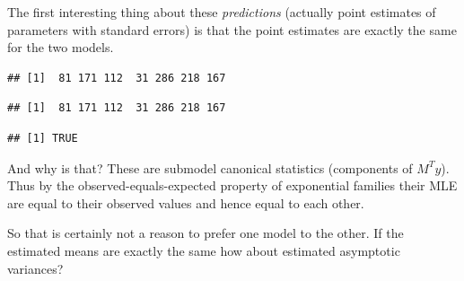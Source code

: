 \documentclass[
  ignorenonframetext,
]{beamer}
\newenvironment{Shaded}{\begin{snugshade}}{\end{snugshade}}
\newcommand{\FunctionTok}[1]{\textcolor[rgb]{0.13,0.29,0.53}{\textbf{#1}}}
\newcommand{\NormalTok}[1]{#1}
\newcommand{\SpecialCharTok}[1]{\textcolor[rgb]{0.81,0.36,0.00}{\textbf{#1}}}
\begin{document}
\begin{frame}[fragile]{}
\protect\hypertarget{section-23}{}
The first interesting thing about these \emph{predictions} (actually
point estimates of parameters with standard errors) is that the point
estimates are exactly the same for the two models.

\vspace{12pt}
\tiny

\begin{Shaded}
\end{Shaded}

\begin{verbatim}
## [1]  81 171 112  31 286 218 167
\end{verbatim}

\begin{Shaded}
\end{Shaded}

\begin{verbatim}
## [1]  81 171 112  31 286 218 167
\end{verbatim}

\begin{Shaded}
\end{Shaded}

\begin{verbatim}
## [1] TRUE
\end{verbatim}

\vspace{12pt}
\normalsize

And why is that? These are submodel canonical statistics (components of
\(M^Ty\)). Thus by the observed-equals-expected property of exponential
families their MLE are equal to their observed values and hence equal to
each other.

So that is certainly not a reason to prefer one model to the other. If
the estimated means are exactly the same how about estimated asymptotic
variances?
\end{frame}
\end{document}
